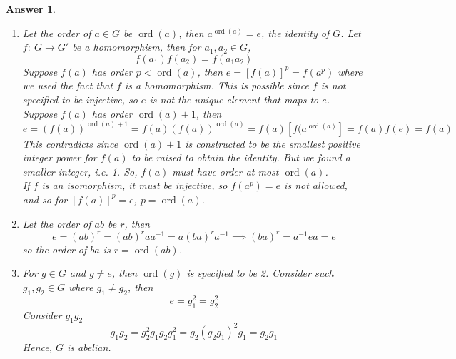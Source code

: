\documentclass[a4paper]{article}
\DeclareMathOperator{\ord}{ord}
\newtheorem{ans}{Answer}[section]
\theoremstyle{new}
\begin{document}
\begin{ans}\leavevmode
\begin{enumerate}[label=(\alph*)]
\item Let the order of $a\in G$ be $\ord(a)$, then $a^{\ord(a)}=e$, the identity of $G$. Let $f:~G\rightarrow G'$ be a homomorphism, then for $a_1,a_2\in G$,
$$f(a_1)f(a_2)=f(a_1a_2)$$
Suppose $f(a)$ has order $p<\ord(a)$, then $e=[f(a)]^p=f(a^p)$ where we used the fact that $f$ is a homomorphism. This is possible since $f$ is not specified to be injective, so $e$ is not the unique element that maps to $e$.\\[5pt]
Suppose $f(a)$ has order $\ord(a)+1$, then
$$e=(f(a))^{\ord(a)+1}=f(a)(f(a))^{\ord(a)}=f(a)[f(a^{\ord(a)}]=f(a)f(e)=f(a)$$
This contradicts since $\ord(a)+1$ is constructed to be the smallest positive integer power for $f(a)$ to be raised to obtain the identity. But we found a smaller integer, i.e. 1. So, $f(a)$ must have order at most $\ord(a)$.\\[5pt]
If $f$ is an isomorphism, it must be injective, so $f(a^p)=e$ is not allowed, and so for $[f(a)]^p=e$, $p=\ord(a)$.
\item Let the order of $ab$ be $r$, then
$$e=(ab)^r=(ab)^raa^{-1}=a(ba)^ra^{-1}\implies(ba)^r=a^{-1}ea=e$$
so the order of $ba$ is $r=\ord(ab)$.
\item For $g\in G$ and $g\neq e$, then $\ord(g)$ is specified to be 2. Consider such $g_1,g_2\in G$ where $g_1\neq g_2$, then
$$e=g_1^2=g_2^2$$
Consider $g_1g_2$
$$g_1g_2=g_2^2g_1g_2g_1^2=g_2(g_2g_1)^2g_1=g_2g_1$$
Hence, $G$ is abelian.
\end{enumerate}
\end{ans}
\newpage
\end{document}
